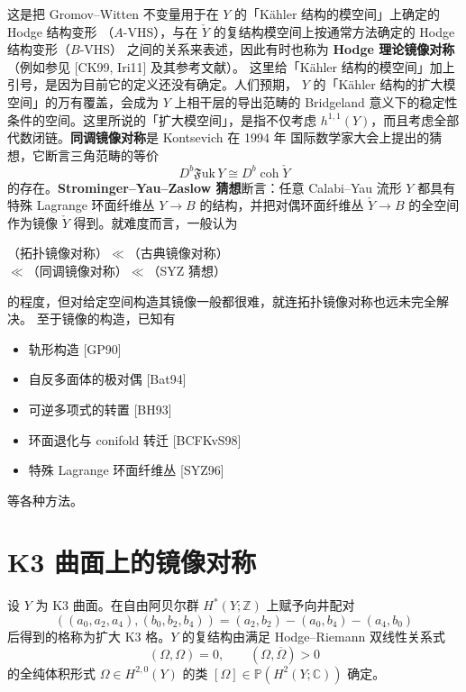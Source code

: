 

这是把 Gromov–Witten 不变量用于在 $Y$ 的「Kähler 结构的模空间」上确定的 Hodge 结构变形
（$A$-VHS），与在 $\check{Y}$ 的复结构模空间上按通常方法确定的 Hodge 结构变形（$B$-VHS）
之间的关系来表述，因此有时也称为 \textbf{Hodge 理论镜像对称}（例如参见 [CK99, Iri11] 及其参考文献）。
这里给「Kähler 结构的模空间」加上引号，是因为目前它的定义还没有确定。人们预期，
$Y$ 的「Kähler 结构的扩大模空间」的万有覆盖，会成为 $Y$ 上相干层的导出范畴的
Bridgeland 意义下的稳定性条件的空间。这里所说的「扩大模空间」，是指不仅考虑
$h^{1,1}(Y)$，而且考虑全部代数闭链。\textbf{同调镜像对称}是 Kontsevich 在 1994 年
国际数学家大会上提出的猜想，它断言三角范畴的等价
\begin{equation}
  D^{b}\mathfrak{F}\mathrm{uk}\,Y \cong D^{b}\operatorname{coh}\check{Y} \tag{1.2}
\end{equation}
的存在。\textbf{Strominger–Yau–Zaslow 猜想}断言：任意 Calabi–Yau 流形 $Y$ 都具有特殊
Lagrange 环面纤维丛 $Y\to B$ 的结构，并把对偶环面纤维丛 $\check{Y}\to B$ 的全空间
作为镜像 $\check{Y}$ 得到。就难度而言，一般认为
\begin{center}
（拓扑镜像对称）$\ll$（古典镜像对称）\\
$\ll$（同调镜像对称）$\ll$（SYZ 猜想）
\end{center}
的程度，但对给定空间构造其镜像一般都很难，就连拓扑镜像对称也远未完全解决。
至于镜像的构造，已知有
\begin{itemize}[leftmargin=2.2em]
  \item 轨形构造 [GP90]
  \item 自反多面体的极对偶 [Bat94]
  \item 可逆多项式的转置 [BH93]
  \item 环面退化与 conifold 转迁 [BCFKvS98]
  \item 特殊 Lagrange 环面纤维丛 [SYZ96]
\end{itemize}
等各种方法。

\section{K3 曲面上的镜像对称}

设 $Y$ 为 K3 曲面。在自由阿贝尔群 $H^{*}(Y;\mathbb{Z})$ 上赋予向井配对
\[
  ((a_{0},a_{2},a_{4}),(b_{0},b_{2},b_{4}))=(a_{2},b_{2})-(a_{0},b_{4})-(a_{4},b_{0})
\]
后得到的格称为扩大 K3 格。$Y$ 的复结构由满足 Hodge–Riemann 双线性关系式
\begin{equation}
  (\Omega,\Omega)=0,\qquad(\Omega,\overline{\Omega})>0 \tag{2.1}
\end{equation}
的全纯体积形式 $\Omega\in H^{2,0}(Y)$ 的类 $[\Omega]\in\mathbb{P}(H^{2}(Y;\mathbb{C}))$ 确定。

